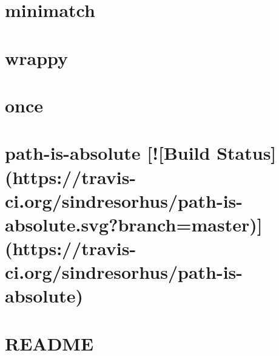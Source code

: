 \documentclass[twoside]{book}
\newcommand{\+}{\discretionary{\mbox{\scriptsize$\hookleftarrow$}}{}{}}
\begin{document}
\chapter{minimatch}
\label{md__c_1__users_martin__documents__git_hub_visual_studio__bachelor__wis_r__wis_r_node_modules_grua4a7d47306f2da44c2a2c4a22e34b19b}
\hypertarget{md__c_1__users_martin__documents__git_hub_visual_studio__bachelor__wis_r__wis_r_node_modules_grua4a7d47306f2da44c2a2c4a22e34b19b}{}

\chapter{wrappy}
\label{md__c_1__users_martin__documents__git_hub_visual_studio__bachelor__wis_r__wis_r_node_modules_gru64f5f915f19672f662849f4bdb6a0d98}
\hypertarget{md__c_1__users_martin__documents__git_hub_visual_studio__bachelor__wis_r__wis_r_node_modules_gru64f5f915f19672f662849f4bdb6a0d98}{}

\chapter{once}
\label{md__c_1__users_martin__documents__git_hub_visual_studio__bachelor__wis_r__wis_r_node_modules_grucefb817c0872cbbfedf18fbd3bdc1d9d}
\hypertarget{md__c_1__users_martin__documents__git_hub_visual_studio__bachelor__wis_r__wis_r_node_modules_grucefb817c0872cbbfedf18fbd3bdc1d9d}{}

\chapter{path-\/is-\/absolute \mbox{[}!\mbox{[}Build Status\mbox{]}(https\+://travis-\/ci.org/sindresorhus/path-\/is-\/absolute.svg?branch=master)\mbox{]}(https\+://travis-\/ci.org/sindresorhus/path-\/is-\/absolute)}
\label{md__c_1__users_martin__documents__git_hub_visual_studio__bachelor__wis_r__wis_r_node_modules_gru57f63683f41d12faea91ffec426e3f3e}
\hypertarget{md__c_1__users_martin__documents__git_hub_visual_studio__bachelor__wis_r__wis_r_node_modules_gru57f63683f41d12faea91ffec426e3f3e}{}

\chapter{R\+E\+A\+D\+M\+E}
\label{md__c_1__users_martin__documents__git_hub_visual_studio__bachelor__wis_r__wis_r_node_modules_gru7458e43fe298ebce3e0b96dad0157c37}
\hypertarget{md__c_1__users_martin__documents__git_hub_visual_studio__bachelor__wis_r__wis_r_node_modules_gru7458e43fe298ebce3e0b96dad0157c37}{}

\end{document}
